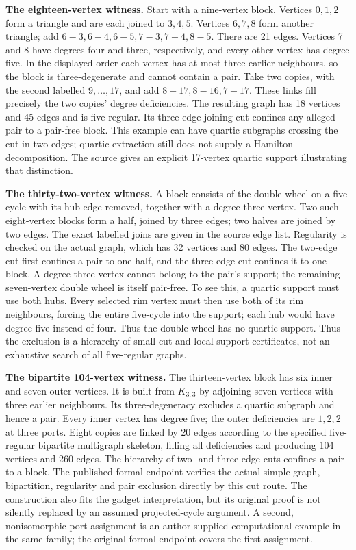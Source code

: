 \documentclass[smallextended]{svjour3}
\begin{document}
\textbf{The eighteen-vertex witness.} Start with a nine-vertex block.
Vertices \(0,1,2\) form a triangle and are each joined to \(3,4,5\).
Vertices \(6,7,8\) form another triangle; add
\(6\!-\!3,6\!-\!4,6\!-\!5,7\!-\!3,7\!-\!4,8\!-\!5\). There are 21 edges.
Vertices 7 and 8 have degrees four and three, respectively, and every
other vertex has degree five. In the displayed order each vertex has at
most three earlier neighbours, so the block is three-degenerate and
cannot contain a pair. Take two copies, with the second labelled
\(9,\ldots,17\), and add \(8\!-\!17,8\!-\!16,7\!-\!17\). These links
fill precisely the two copies' degree deficiencies. The resulting graph
has 18 vertices and 45 edges and is five-regular. Its three-edge joining
cut confines any alleged pair to a pair-free block. This example can
have quartic subgraphs crossing the cut in two edges; quartic extraction
still does not supply a Hamilton decomposition. The source gives an
explicit 17-vertex quartic support illustrating that distinction.

\textbf{The thirty-two-vertex witness.} A block consists of the double
wheel on a five-cycle with its hub edge removed, together with a
degree-three vertex. Two such eight-vertex blocks form a half, joined by
three edges; two halves are joined by two edges. The exact labelled
joins are given in the source edge list. Regularity is checked on the
actual graph, which has 32 vertices and 80 edges. The two-edge cut first
confines a pair to one half, and the three-edge cut confines it to one
block. A degree-three vertex cannot belong to the pair's support; the
remaining seven-vertex double wheel is itself pair-free. To see this, a
quartic support must use both hubs. Every selected rim vertex must then
use both of its rim neighbours, forcing the entire five-cycle into the
support; each hub would have degree five instead of four. Thus the
double wheel has no quartic support. Thus the exclusion is a hierarchy
of small-cut and local-support certificates, not an exhaustive search of
all five-regular graphs.

\textbf{The bipartite 104-vertex witness.} The thirteen-vertex block has
six inner and seven outer vertices. It is built from \(K_{3,3}\) by
adjoining seven vertices with three earlier neighbours. Its
three-degeneracy excludes a quartic subgraph and hence a pair. Every
inner vertex has degree five; the outer deficiencies are \(1,2,2\) at
three ports. Eight copies are linked by 20 edges according to the
specified five-regular bipartite multigraph skeleton, filling all
deficiencies and producing 104 vertices and 260 edges. The hierarchy of
two- and three-edge cuts confines a pair to a block. The published
formal endpoint verifies the actual simple graph, bipartition,
regularity and pair exclusion directly by this cut route. The
construction also fits the gadget interpretation, but its original proof
is not silently replaced by an assumed projected-cycle argument. A
second, nonisomorphic port assignment is an author-supplied
computational example in the same family; the original formal endpoint
covers the first assignment.
\end{document}
